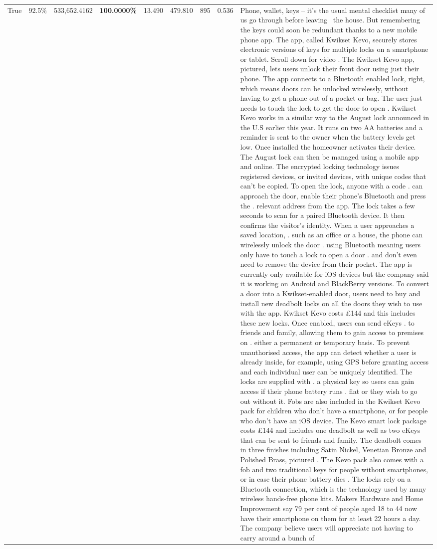 \begin{table}[H]
\begin{tabular}{lllrlllll}
True & 92.5\% & 533,652.4162 & \bfseries \color{red} 100.0000\% & 13.490 & 479.810 & 895 & 0.536 & Phone, wallet, keys – it’s the usual mental checklist many of us go through before leaving  the house. But remembering the keys could soon be redundant thanks to a new mobile phone app. The app, called Kwikset Kevo, securely stores electronic versions of keys for multiple locks on a smartphone or tablet. Scroll down for video . The Kwikset Kevo app, pictured, lets users unlock their front door using just their phone. The app connects to a Bluetooth enabled lock, right, which means doors can be unlocked wirelessly, without having to get a phone out of a pocket or bag. The user just needs to touch the lock to get the door to open . Kwikset Kevo works in a similar way to the August lock announced in the U.S earlier this year. It runs on two AA batteries and a reminder is sent to the owner when the battery levels get low. Once installed the homeowner activates their device. The August lock can then be managed using a mobile app and online. The encrypted locking technology issues registered devices, or invited devices, with unique codes that can't be copied. To open the lock, anyone with a code . can approach the door, enable their phone's Bluetooth and press the . relevant address from the app. The lock takes a few seconds to scan for a paired Bluetooth device. It then confirms the visitor's identity. When a user approaches a saved location, . such as an office or a house, the phone can wirelessly unlock the door . using Bluetooth meaning users only have to touch a lock to open a door . and don't even need to remove the device from their pocket. The app is currently only available for iOS devices but the company said it is working on Android and BlackBerry versions. To convert a door into a Kwikset-enabled door, users need to buy and install new deadbolt locks on all the doors they wish to use with the app. Kwikset Kevo costs £144 and this includes these new locks. Once enabled, users can send eKeys . to friends and family, allowing them to gain access to premises on . either a permanent or temporary basis. To prevent unauthorised access, the app can detect whether a user is already inside, for example, using GPS before granting access and each individual user can be uniquely identified. The locks are supplied with . a physical key so users can gain access if their phone battery runs . flat or they wish to go out without it. Fobs are also included in the Kwikset Kevo pack for children who don't have a smartphone, or for people who don't have an iOS device. The Kevo smart lock package costs £144 and includes one deadbolt as well as two eKeys that can be sent to friends and family. The deadbolt comes in three finishes including Satin Nickel, Venetian Bronze and Polished Brass, pictured . The Kevo pack also comes with a fob and two traditional keys for people without smartphones, or in case their phone battery dies . The locks rely on a Bluetooth connection, which is the technology used by many wireless hands-free phone kits. Makers Hardware and Home Improvement say 79 per cent of people aged 18 to 44 now have their smartphone on them for at least 22 hours a day. The company believe users will appreciate not having to carry around a bunch of 
\end{tabular}
\end{table}
